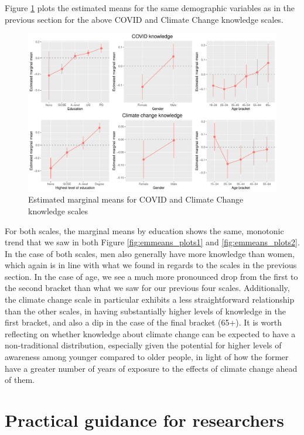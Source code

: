 \documentclass[11pt,halfline,a4paper,]{ouparticle}
\begin{document}
Figure \ref{fig:emmeans_plots4} plots the estimated means for the same
demographic variables as in the previous section for the above COVID and
Climate Change knowledge scales.

\begin{figure}[!h]
\includegraphics[width=1\linewidth]{Revisiting-the-Measurement-and-Dimensionality-of-Political-Knowledge--Evidence-from-Seven-European-Countries_files/figure-latex/emmeans_plots4-1} \caption{Estimated marginal means for COVID and Climate Change knowledge scales}\label{fig:emmeans_plots4}
\end{figure}

For both scales, the marginal means by education shows the same,
monotonic trend that we saw in both Figure \ref{fig:emmeans_plots1} and
\ref{fig:emmeans_plots2}. In the case of both scales, men also generally
have more knowledge than women, which again is in line with what we
found in regards to the scales in the previous section. In the case of
age, we see a much more pronounced drop from the first to the second
bracket than what we saw for our previous four scales. Additionally, the
climate change scale in particular exhibits a less straightforward
relationship than the other scales, in having substantially higher
levels of knowledge in the first bracket, and also a dip in the case of
the final bracket (65+). It is worth reflecting on whether knowledge
about climate change can be expected to have a non-traditional
distribution, especially given the potential for higher levels of
awareness among younger compared to older people, in light of how the
former have a greater number of years of exposure to the effects of
climate change ahead of them.

\hypertarget{practical-guidance-for-researchers}{%
\section{Practical guidance for
researchers}\label{practical-guidance-for-researchers}}
\end{document}
